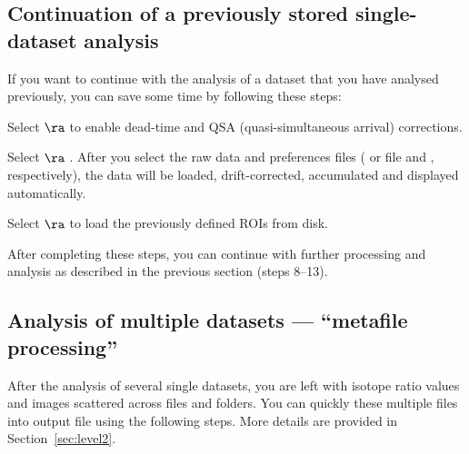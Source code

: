\subsection{Continuation of a previously stored single-dataset analysis}
\setcounter{step}{0}

\goldbox{}
If you want to continue with the analysis of a dataset that you have analysed previously, you can save some time by following these steps:
\tcbe

\s Select  $\ra$  to enable dead-time and QSA (quasi-simultaneous arrival) corrections.

\s Select  $\ra$ . After you select the raw data and preferences files ( or  file and , respectively), the data will be loaded, drift-corrected, accumulated and displayed automatically.


 
\s Select  $\ra$  to load the previously defined ROIs from disk.



\bul After completing these steps, you can continue with further processing and analysis as described in the previous section (steps 8--13).


\subsection{Analysis of multiple datasets --- ``metafile processing''}
\setcounter{step}{0}

\goldbox{}
After the analysis of several single datasets, you are left with isotope ratio values and images scattered across  files and folders. You can quickly  these multiple files into  output file using the following steps. More details are provided in Section~\ref{sec:level2}.
\tcbe

